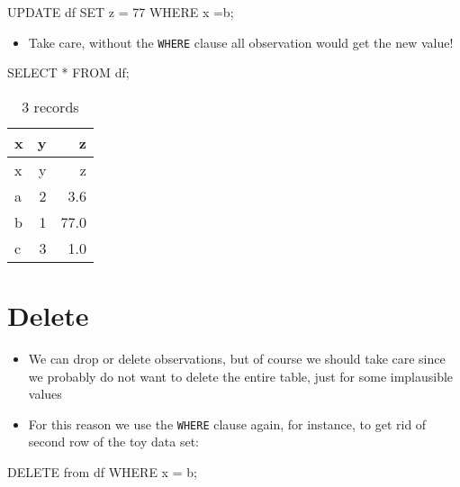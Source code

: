 \documentclass[
  letterpaper,
  DIV=11,
  numbers=noendperiod]{scrreprt}
\newenvironment{Shaded}{\begin{snugshade}}{\end{snugshade}}
\newcommand{\DecValTok}[1]{\textcolor[rgb]{0.68,0.00,0.00}{#1}}
\newcommand{\KeywordTok}[1]{\textcolor[rgb]{0.00,0.23,0.31}{#1}}
\newcommand{\NormalTok}[1]{\textcolor[rgb]{0.00,0.23,0.31}{#1}}
\newcommand{\OperatorTok}[1]{\textcolor[rgb]{0.37,0.37,0.37}{#1}}
\newcommand{\StringTok}[1]{\textcolor[rgb]{0.13,0.47,0.30}{#1}}
\providecommand{\tightlist}{%
  \setlength{\itemsep}{0pt}\setlength{\parskip}{0pt}}\usepackage{longtable,booktabs,array}
\begin{document}
\begin{Shaded}
\begin{Highlighting}[]
\KeywordTok{UPDATE}\NormalTok{ df }\KeywordTok{SET}\NormalTok{ z }\OperatorTok{=} \DecValTok{77} \KeywordTok{WHERE}\NormalTok{ x }\OperatorTok{=}\StringTok{\textquotesingle{}b\textquotesingle{}}\NormalTok{;}
\end{Highlighting}
\end{Shaded}

\begin{itemize}
\tightlist
\item
  Take care, without the \texttt{WHERE} clause all observation would get
  the new value!
\end{itemize}

\begin{Shaded}
\begin{Highlighting}[]
\KeywordTok{SELECT} \OperatorTok{*} \KeywordTok{FROM}\NormalTok{ df;}
\end{Highlighting}
\end{Shaded}

\begin{longtable}[]{@{}lrr@{}}
\caption{3 records}\tabularnewline
\toprule()
x & y & z \\
\midrule()
\endfirsthead
\toprule()
x & y & z \\
\midrule()
\endhead
a & 2 & 3.6 \\
b & 1 & 77.0 \\
c & 3 & 1.0 \\
\bottomrule()
\end{longtable}

\hypertarget{delete}{%
\section{Delete}\label{delete}}

\begin{itemize}
\item
  We can drop or delete observations, but of course we should take care
  since we probably do not want to delete the entire table, just for
  some implausible values
\item
  For this reason we use the \texttt{WHERE} clause again, for instance,
  to get rid of second row of the toy data set:
\end{itemize}

\begin{Shaded}
\begin{Highlighting}[]
\KeywordTok{DELETE} \KeywordTok{from}\NormalTok{ df }\KeywordTok{WHERE}\NormalTok{ x }\OperatorTok{=} \StringTok{\textquotesingle{}b\textquotesingle{}}\NormalTok{;}
\end{Highlighting}
\end{Shaded}
\end{document}

